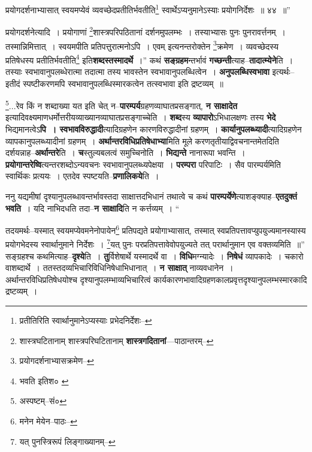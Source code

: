 \documentclass[article,12pt,a4paper]{memoir}
\begin{document}
	प्रयोगदर्शनाभ्यासात् स्वयमप्येवं व्यवच्छेदप्रतीतिर्भवतीति\footnote{प्रतीतिरिति स्वार्थानुमानेऽप्यस्याः प्रभेदनिर्देशः--\cite{dp-msC}} स्वार्थेऽप्यनुमानेऽस्याः प्रयोगनिर्देशः ॥ ४४ ॥” 
	  
	प्रयोगदर्शनेत्यादि । प्रयोगाणां \footnote{शास्त्रघटितानाम् \cite{dp-msA} \cite{dp-edP} \cite{dp-edH} \cite{dp-edE} \cite{dp-edN} शास्त्रपरिघटितानाम् \cite{dp-msB} \textbf{शास्त्रगदितानां}—पाठान्तरम्--\cite{dp-msD-n}}शास्त्रपरिपठितानां दर्शनमुपलम्भः । तस्याभ्यासः पुनः पुनरावर्त्तनम् । तस्मान्निमित्तात् । स्वयमपीति प्रतिपत्तुरात्मनोऽपि । एवम् इत्यनन्तरोक्तेन \footnote{प्रयोगदर्शनाभ्यासक्रमेण--\cite{dp-msD-n}}क्रमेण । व्यवच्छेदस्य प्रतिषेधस्य प्रतीतिर्भवतीति\footnote{भवति इतिश० \cite{dp-msC} \cite{dp-msB}} इति\textbf{शब्दस्तस्मादर्थे} ।” कथं \textbf{सङ्ग्रहम}न्तर्भावं \textbf{गच्छन्ती}त्याह--\textbf{तादात्म्येने}ति । तस्याः स्वभावानुपलब्धेरात्मा तदात्मा तस्य भावस्तेन स्वभावानुपलब्धित्वेन । \textbf{अनुपलब्धिस्वभावा} इत्यर्थः--इतीदं स्पष्टीकरणमपि स्वभावानुपलब्धिस्मारकत्वेन तत्स्वभावा इति द्रष्टव्यम् ॥
	\pend
      

	  \pstart \footnote{अस्पष्टम्--सं०}...रेव किं न शब्दाख्या यत इति चेत् न--\textbf{पारम्पर्य}ग्रहणव्याघातप्रसङ्गात्, \textbf{न साक्षादेत} इत्यादिवक्ष्यमाणधर्मोत्तरीयव्याख्यानव्याघातप्रसङ्गाच्चेति । \textbf{शब्द}स्य \textbf{व्यापारो}ऽभिधालक्षणः तस्य \textbf{भेदे} भिद्यमानत्वेऽ\textbf{पि । स्वभावविरुद्धादी}त्यादिग्रहणेन कारणविरुद्धादीनां ग्रहणम् । \textbf{कार्यानुपलब्ध्यादी}त्यादिग्रहणेन व्यापकानुपलब्ध्यादीनां ग्रहणम् । \textbf{अर्थान्तरविधिप्रतिषेधाभ्या}मिति मूले करणतृतीयाद्विवचनान्तमेतदिति दर्शयन्नाह--\textbf{अर्थान्तरे}ति । \textbf{च}स्तुल्यबलत्वं समुच्चिनोति । \textbf{भिद्यन्ते} नानारूपा भवन्ति । \textbf{प्रयोगान्तरेष्वि}त्यन्तरशब्दोऽन्यवचनः स्वभावानुपलब्ध्यपेक्षया । \textbf{परम्परा} परिपाटिः । सैव पारम्पर्यमिति स्वार्थिकः प्रत्ययः । एतदेव स्पष्टयति--\textbf{प्रणालिकये}ति ।
	\pend
      

	  \pstart ननु यद्यमीषां दृश्यानुपलब्धावन्तर्भावस्तदा साक्षात्तदभिधानं तथात्वे च कथं \textbf{पारम्पर्येणे}त्याशङ्क्याह--\textbf{एतदुक्तं भवति} । यदि नाभिदधति तदा--\textbf{न साक्षादि}ति न कर्त्तव्यम् ।  \leavevmode{} “
	  
	तदयमर्थः--यस्मात् स्वयमप्येवमनेनोपायेन\footnote{मनेन मेयेन--पाठः--\cite{dp-msD-n}} प्रतिपद्यते प्रयोगाभ्यासात्, तस्मात् स्वप्रतिपत्तावप्युपयुज्यमानस्यास्य प्रयोगभेदस्य स्वार्थानुमाने निर्देशः । \footnote{यत् पुनस्त्रिरूपं लिङ्गाख्यानम्--\cite{dp-msD-n}}यत् पुनः परप्रतिपत्तावेवोपयुज्यते तत् परार्थानुमान एव वक्तव्यमिति ॥” सङ्ग्रहश्च कथमित्याह--\textbf{दृश्ये}ति । \textbf{तु}र्विशेषार्थे यस्मादर्थे वा । \textbf{विधि}मग्न्यादेः । \textbf{निषेधं} व्यापकादेः । चकारो वाशब्दार्थे । ततस्तदव्यभिचारिविधिनिषेधाभिधानात् । \textbf{न साक्षात्} नाव्यवधानेन । अर्थान्तरविधिप्रतिषेधयोश्च दृश्यानुपलम्भाव्यभिचारित्वं कार्यकारणभावादिग्रहणकालप्रवृत्तदृश्यानुपलम्भस्मारकादि द्रष्टव्यम् ।
	\pend
      
\end{document}
